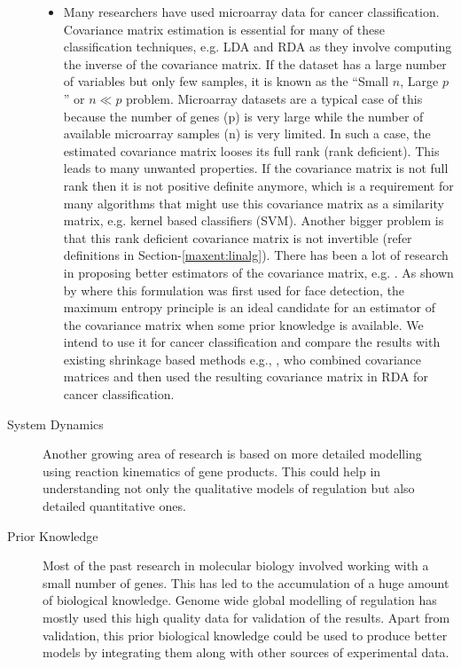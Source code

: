\begin{description}
\begin{itemize}
    \item Many researchers have used microarray data for cancer classification. Covariance matrix estimation is essential for many of these classification techniques, e.g. \ac{LDA} and \ac{RDA} as they involve computing the inverse of the covariance matrix. If the dataset has a large number of variables but only few samples, it is known as the ``Small $n$, Large $p$'' or $n\ll p$ problem. Microarray datasets are a typical case of this because the number of genes (p) is very large while the number of available microarray samples (n) is very limited. In such a case, the estimated covariance matrix looses its full rank (rank deficient). This leads to many unwanted properties. If the covariance matrix is not full rank then it is not positive definite anymore, which is a requirement for many algorithms that might use this covariance matrix as a similarity matrix, e.g. kernel based classifiers (SVM). Another bigger problem is that this rank deficient covariance matrix is not invertible (refer definitions in Section-\ref{maxent:linalg}). There has been a lot of research in proposing better estimators of the covariance matrix, e.g. \citet{schaefer05shrinkage}. As shown by \citet{carlos05maximum} where this formulation was first used for face detection, the maximum entropy principle is an ideal candidate for an estimator of the covariance matrix when some prior knowledge is available. We intend to use it for cancer classification and compare the results with existing shrinkage based methods e.g., \citet{Tai2008Incorporating}, who combined covariance matrices and then used the resulting covariance matrix in \ac{RDA} for cancer classification.  
\end{itemize}

\item[System Dynamics] Another growing area of research is based on more detailed modelling using reaction kinematics of gene products. This could help in understanding not only the qualitative models of regulation but also detailed quantitative ones. 

\item[Prior Knowledge] Most of the past research in molecular biology involved working with a small number of genes. This has led to the accumulation of a huge amount of biological knowledge. Genome wide global modelling of regulation has mostly used this high quality data for validation of the results. Apart from validation, this prior biological knowledge could be used to produce better models by integrating them along with other sources of experimental data.


\end{description}
